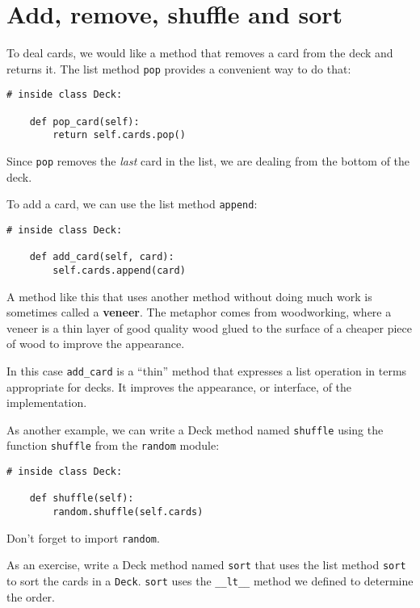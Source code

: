 \documentclass[10pt]{book}
\begin{document}
\section{Add, remove, shuffle and sort}

To deal cards, we would like a method that
removes a card from the deck and returns it.
The list method {\tt pop} provides a convenient way to do that:

\begin{verbatim}
# inside class Deck:

    def pop_card(self):
        return self.cards.pop()
\end{verbatim}
%
Since {\tt pop} removes the {\em last} card in the list, we are
dealing from the bottom of the deck.

To add a card, we can use the list method {\tt append}:

\begin{verbatim}
# inside class Deck:

    def add_card(self, card):
        self.cards.append(card)
\end{verbatim}
%
A method like this that uses another method without doing
much work is sometimes called a {\bf veneer}.  The metaphor
comes from woodworking, where a veneer is a thin
layer of good quality wood glued to the surface of a cheaper piece of
wood to improve the appearance.

In this case \verb"add_card" is a ``thin'' method that expresses
a list operation in terms appropriate for decks.  It
improves the appearance, or interface, of the
implementation.

As another example, we can write a Deck method named {\tt shuffle}
using the function {\tt shuffle} from the {\tt random} module:

\begin{verbatim}
# inside class Deck:
            
    def shuffle(self):
        random.shuffle(self.cards)
\end{verbatim}
%
Don't forget to import {\tt random}.

As an exercise, write a Deck method named {\tt sort} that uses the
list method {\tt sort} to sort the cards in a {\tt Deck}.  {\tt sort}
uses the \verb"__lt__" method we defined to determine the order.
 
\end{document}

